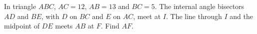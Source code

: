 In triangle $ABC$, $AC=12$, $AB=13$ and $BC=5$. The internal angle bisectors $AD$ and $BE$, with $D$ on $BC$ and $E$ on $AC$, meet at $I$. The line through $I$ and the midpoint of $DE$ meets $AB$ at $F$. Find $AF$.

